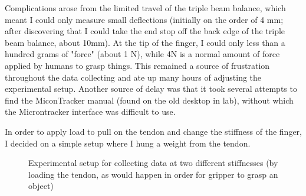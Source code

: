 \documentclass[preprint,12pt,3p]{elsarticle}
\begin{document}
Complications arose from the limited travel of the triple beam balance, which meant I could only
measure small deflections (initially on the order of 4 mm; after discovering that I could take the
end stop off the back edge of the triple beam balance, about 10mm). At the tip of the finger, I
could only less than a hundred grams of "force" (about 1 N), while 4N is a normal amount of force
applied by humans to grasp things. This remained a source of frustration throughout the data
collecting and ate up many hours of adjusting the experimental setup.
Another source of delay was that it took several attempts to find the MiconTracker manual (found on
the old desktop in lab), without which the Microntracker interface was difficult
to use.

In order to apply load to pull on the tendon and change the stiffness of the finger, I decided on a
simple setup where I hung a weight from the tendon.

\begin{figure}[H]
    \centering 
        \hfil %
        \hfil
        \caption{Experimental setup for collecting data at two different
        stiffnesses (by loading the tendon, as would happen in order for gripper
    to grasp an object)}
\end{figure}
\end{document}
